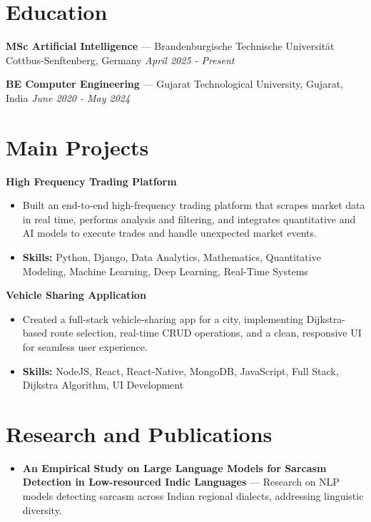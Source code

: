 \documentclass[a4paper,10pt]{article}
\begin{document}
\section*{Education}
\textbf{MSc Artificial Intelligence} — Brandenburgische Technische Universität Cottbus-Senftenberg, Germany \hfill \textit{April 2025 - Present}\par
\vspace{1.5pt}
\textbf{BE Computer Engineering} — Gujarat Technological University, Gujarat, India \hfill \textit{June 2020 - May 2024}\par

\section*{Main Projects}
\textbf{High Frequency Trading Platform}\par
\vspace{1pt}
\begin{itemize}
  \item Built an end-to-end high-frequency trading platform that scrapes market data in real time, performs analysis and filtering, and integrates quantitative and AI models to execute trades and handle unexpected market events.
  \item \textbf{Skills:} Python, Django, Data Analytics, Mathematics, Quantitative Modeling, Machine Learning, Deep Learning, Real-Time Systems
\end{itemize}
\vspace{3pt}
\textbf{Vehicle Sharing Application}\par
\vspace{1pt}
\begin{itemize}
  \item Created a full-stack vehicle-sharing app for a city, implementing Dijkstra-based route selection, real-time CRUD operations, and a clean, responsive UI for seamless user experience.
  \item \textbf{Skills:} NodeJS, React, React-Native, MongoDB, JavaScript, Full Stack, Dijkstra Algorithm, UI Development
\end{itemize}

\section*{Research and Publications}
\begin{itemize}
\item \textbf{An Empirical Study on Large Language Models for Sarcasm Detection in Low-resourced Indic Languages} — Research on NLP models detecting sarcasm across Indian regional dialects, addressing linguistic diversity.
\end{itemize}
\end{document}
